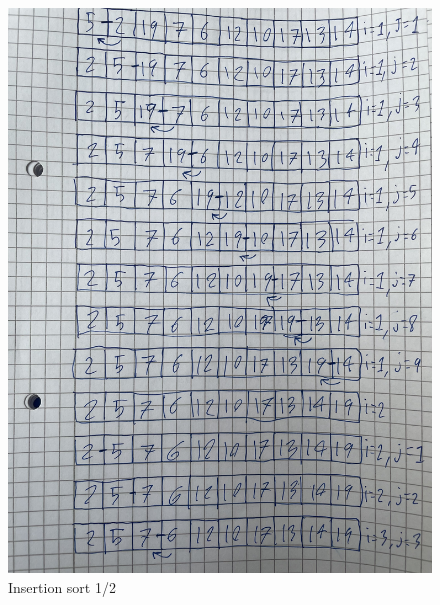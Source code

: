 \documentclass[a4paper,12pt]{article}
\begin{document}
\begin{figure}[H] 
    \centering
    \includegraphics[scale=0.13]{IMG_2074.jpg}
    \caption{Insertion sort 1/2}
\end{figure}
\end{document}
